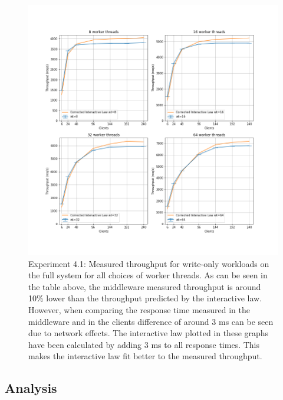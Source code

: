 \documentclass[11pt,a4paper]{article}
\begin{document}
 \begin{figure}
\centering
\includegraphics[width=1\textwidth]{41/41_il}
\caption{Experiment 4.1: Measured throughput for write-only workloads on the full system for all choices of worker threads. As can be seen in the table above, the middleware measured throughput is around 10\% lower than the throughput predicted by the interactive law. However, when comparing the response time measured in the middleware and in the clients difference of around 3 ms can be seen due to network effects. The interactive law plotted in these graphs have been calculated by adding 3 ms to all response times. This makes the interactive law fit better to the measured throughput. }
\label{fig:41_il}
\end{figure}


\subsection{Analysis}
\end{document}

